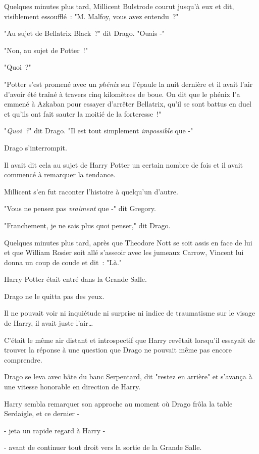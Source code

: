 Quelques minutes plus tard, Millicent Bulstrode courut jusqu'à eux et dit, visiblement essoufflé~: "M. Malfoy, vous avez entendu~?"

"Au sujet de Bellatrix Black~?" dit Drago. "Ouais -"

"Non, au sujet de Potter~!"

"Quoi~?"

"Potter s'est promené avec un \emph{phénix} sur l'épaule la nuit dernière et il avait l'air d'avoir été traîné à travers cinq kilomètres de boue. On dit que le phénix l'a emmené à Azkaban pour essayer d'arrêter Bellatrix, qu'il se sont battus en duel et qu'ils ont fait sauter la moitié de la forteresse~!"

"\emph{Quoi~?}" dit Drago. "Il est tout simplement \emph{impossible} que -"

Drago s'interrompit.

Il avait dit cela au sujet de Harry Potter un certain nombre de fois et il avait commencé à remarquer la tendance.

Millicent s'en fut raconter l'histoire à quelqu'un d'autre.

"Vous ne pensez pas \emph{vraiment} que -" dit Gregory.

"Franchement, je ne sais plus quoi penser," dit Drago.

Quelques minutes plus tard, après que Theodore Nott se soit assis en face de lui et que William Rosier soit allé s'asseoir avec les jumeaux Carrow, Vincent lui donna un coup de coude et dit~: "Là."

Harry Potter était entré dans la Grande Salle.

Drago ne le quitta pas des yeux.

Il ne pouvait voir ni inquiétude ni surprise ni indice de traumatisme sur le visage de Harry, il avait juste l'air…

C'était le même air distant et introspectif que Harry revêtait lorsqu'il essayait de trouver la réponse à une question que Drago ne pouvait même pas encore comprendre.

Drago se leva avec hâte du banc Serpentard, dit "restez en arrière" et s'avança à une vitesse honorable en direction de Harry.

Harry sembla remarquer son approche au moment où Drago frôla la table Serdaigle, et ce dernier -

- jeta un rapide regard à Harry -

- avant de continuer tout droit vers la sortie de la Grande Salle.

